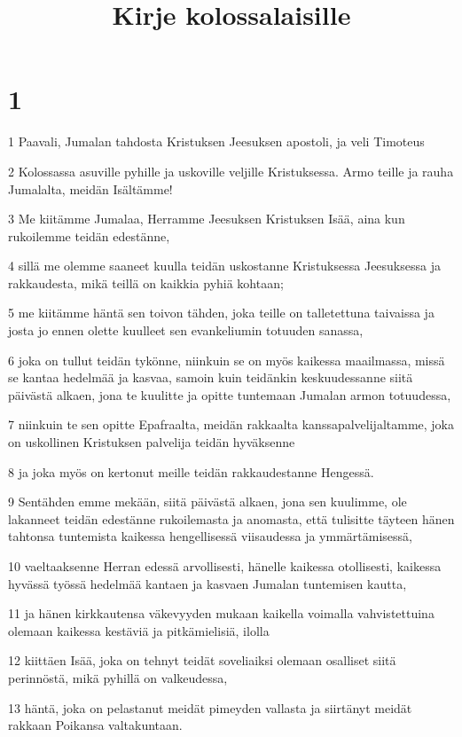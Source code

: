 

\title{Kirje kolossalaisille}


\chapter{1}

\par 1 Paavali, Jumalan tahdosta Kristuksen Jeesuksen apostoli, ja veli Timoteus
\par 2 Kolossassa asuville pyhille ja uskoville veljille Kristuksessa. Armo teille ja rauha Jumalalta, meidän Isältämme!
\par 3 Me kiitämme Jumalaa, Herramme Jeesuksen Kristuksen Isää, aina kun rukoilemme teidän edestänne,
\par 4 sillä me olemme saaneet kuulla teidän uskostanne Kristuksessa Jeesuksessa ja rakkaudesta, mikä teillä on kaikkia pyhiä kohtaan;
\par 5 me kiitämme häntä sen toivon tähden, joka teille on talletettuna taivaissa ja josta jo ennen olette kuulleet sen evankeliumin totuuden sanassa,
\par 6 joka on tullut teidän tykönne, niinkuin se on myös kaikessa maailmassa, missä se kantaa hedelmää ja kasvaa, samoin kuin teidänkin keskuudessanne siitä päivästä alkaen, jona te kuulitte ja opitte tuntemaan Jumalan armon totuudessa,
\par 7 niinkuin te sen opitte Epafraalta, meidän rakkaalta kanssapalvelijaltamme, joka on uskollinen Kristuksen palvelija teidän hyväksenne
\par 8 ja joka myös on kertonut meille teidän rakkaudestanne Hengessä.
\par 9 Sentähden emme mekään, siitä päivästä alkaen, jona sen kuulimme, ole lakanneet teidän edestänne rukoilemasta ja anomasta, että tulisitte täyteen hänen tahtonsa tuntemista kaikessa hengellisessä viisaudessa ja ymmärtämisessä,
\par 10 vaeltaaksenne Herran edessä arvollisesti, hänelle kaikessa otollisesti, kaikessa hyvässä työssä hedelmää kantaen ja kasvaen Jumalan tuntemisen kautta,
\par 11 ja hänen kirkkautensa väkevyyden mukaan kaikella voimalla vahvistettuina olemaan kaikessa kestäviä ja pitkämielisiä, ilolla
\par 12 kiittäen Isää, joka on tehnyt teidät soveliaiksi olemaan osalliset siitä perinnöstä, mikä pyhillä on valkeudessa,
\par 13 häntä, joka on pelastanut meidät pimeyden vallasta ja siirtänyt meidät rakkaan Poikansa valtakuntaan.
